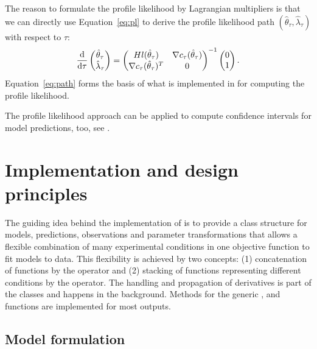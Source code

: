 \documentclass[article]{jss}
\begin{document}
The reason to formulate the profile likelihood by Lagrangian multipliers is that we can directly use Equation~\ref{eq:pl} to derive the profile likelihood path $(\hat \theta_{\tau}, \hat\lambda_{\tau})$ with respect to $\tau$:
\begin{align}
\frac{\rm d}{{\rm d} \tau}
\begin{pmatrix}
\hat\theta_{\tau} \\ \hat\lambda_{\tau}
\end{pmatrix} =
\begin{pmatrix}
Hl(\hat\theta_{\tau}) & \nabla c_{\tau}(\hat \theta_{\tau})\\
\nabla c_{\tau}(\hat\theta_{\tau})^T & 0
\end{pmatrix}^{-1}
\begin{pmatrix}
0 \\ 1
\end{pmatrix}.
\label{eq:path}
\end{align}
Equation~\ref{eq:path} forms the basis of what is implemented in  for computing the profile likelihood.

The profile likelihood approach can be applied to compute confidence intervals for model predictions, too, see \cite{kreutz2012likelihood, hass2016fast}.

\vspace*{-0.3cm}

\section{Implementation and design principles}
\label{sec:implementation}

The guiding idea behind the implementation of  is to provide a class structure for models, predictions, observations and parameter transformations that allows a flexible combination of many experimental conditions in one objective function to fit models to data. This flexibility is achieved by two concepts: (1) concatenation of functions by the  operator and (2) stacking of functions representing different conditions by the  operator. The handling and propagation of derivatives is part of the classes and happens in the background. Methods for the generic ,  and  functions are implemented for most outputs.

\vspace*{-0.3cm}

\subsection{Model formulation}
\end{document}
